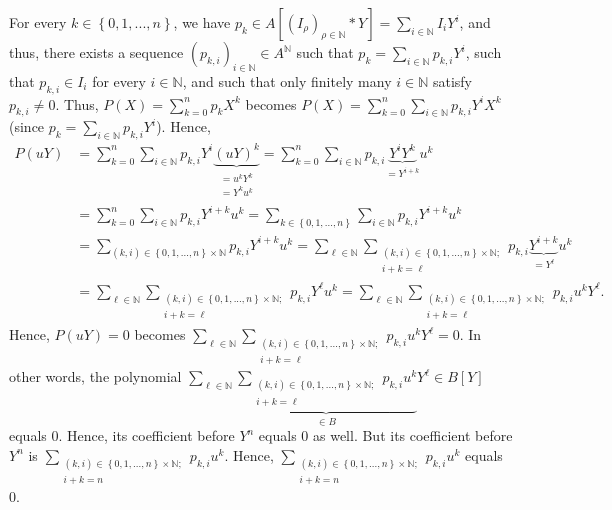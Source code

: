 \documentclass[12pt,final,notitlepage,onecolumn]{article}%
\begin{document}
For every $k\in\left\{  0,1,...,n\right\}  $, we have $p_{k}\in A\left[
\left(  I_{\rho}\right)  _{\rho\in\mathbb{N}}\ast Y\right]  =\sum
\limits_{i\in\mathbb{N}}I_{i}Y^{i}$, and thus, there exists a sequence
$\left(  p_{k,i}\right)  _{i\in\mathbb{N}}\in A^{\mathbb{N}}$ such that
$p_{k}=\sum\limits_{i\in\mathbb{N}}p_{k,i}Y^{i}$, such that $p_{k,i}\in I_{i}$
for every $i\in\mathbb{N}$, and such that only finitely many $i\in\mathbb{N}$
satisfy $p_{k,i}\neq0$. Thus, $P\left(  X\right)  =\sum\limits_{k=0}^{n}%
p_{k}X^{k}$ becomes $P\left(  X\right)  =\sum\limits_{k=0}^{n}\sum
\limits_{i\in\mathbb{N}}p_{k,i}Y^{i}X^{k}$ (since $p_{k}=\sum\limits_{i\in
\mathbb{N}}p_{k,i}Y^{i}$). Hence,
\begin{align*}
P\left(  uY\right)   &  =\sum\limits_{k=0}^{n}\sum\limits_{i\in\mathbb{N}%
}p_{k,i}Y^{i}\underbrace{\left(  uY\right)  ^{k}}_{\substack{=u^{k}%
Y^{k}\\=Y^{k}u^{k}}}=\sum\limits_{k=0}^{n}\sum\limits_{i\in\mathbb{N}}%
p_{k,i}\underbrace{Y^{i}Y^{k}}_{=Y^{i+k}}u^{k}\\
&  =\sum\limits_{k=0}^{n}\sum\limits_{i\in\mathbb{N}}p_{k,i}Y^{i+k}u^{k}%
=\sum\limits_{k\in\left\{  0,1,...,n\right\}  }\sum\limits_{i\in\mathbb{N}%
}p_{k,i}Y^{i+k}u^{k}\\
&  =\sum\limits_{\left(  k,i\right)  \in\left\{  0,1,...,n\right\}
\times\mathbb{N}}p_{k,i}Y^{i+k}u^{k}=\sum_{\ell\in\mathbb{N}}\sum
\limits_{\substack{\left(  k,i\right)  \in\left\{  0,1,...,n\right\}
\times\mathbb{N};\\i+k=\ell}}p_{k,i}\underbrace{Y^{i+k}}_{=Y^{\ell}}u^{k}\\
&  =\sum_{\ell\in\mathbb{N}}\sum\limits_{\substack{\left(  k,i\right)
\in\left\{  0,1,...,n\right\}  \times\mathbb{N};\\i+k=\ell}}p_{k,i}Y^{\ell
}u^{k}=\sum_{\ell\in\mathbb{N}}\sum\limits_{\substack{\left(  k,i\right)
\in\left\{  0,1,...,n\right\}  \times\mathbb{N};\\i+k=\ell}}p_{k,i}%
u^{k}Y^{\ell}.
\end{align*}
Hence, $P\left(  uY\right)  =0$ becomes $\sum\limits_{\ell\in\mathbb{N}}%
\sum\limits_{\substack{\left(  k,i\right)  \in\left\{  0,1,...,n\right\}
\times\mathbb{N};\\i+k=\ell}}p_{k,i}u^{k}Y^{\ell}=0$. In other words, the
polynomial $\sum\limits_{\ell\in\mathbb{N}}\underbrace{\sum
\limits_{\substack{\left(  k,i\right)  \in\left\{  0,1,...,n\right\}
\times\mathbb{N};\\i+k=\ell}}p_{k,i}u^{k}}_{\in B}Y^{\ell}\in B\left[
Y\right]  $ equals $0$. Hence, its coefficient before $Y^{n}$ equals $0$ as
well. But its coefficient before $Y^{n}$ is $\sum\limits_{\substack{\left(
k,i\right)  \in\left\{  0,1,...,n\right\}  \times\mathbb{N};\\i+k=n}%
}p_{k,i}u^{k}$. Hence, $\sum\limits_{\substack{\left(  k,i\right)  \in\left\{
0,1,...,n\right\}  \times\mathbb{N};\\i+k=n}}p_{k,i}u^{k}$ equals $0$.
\end{document}

